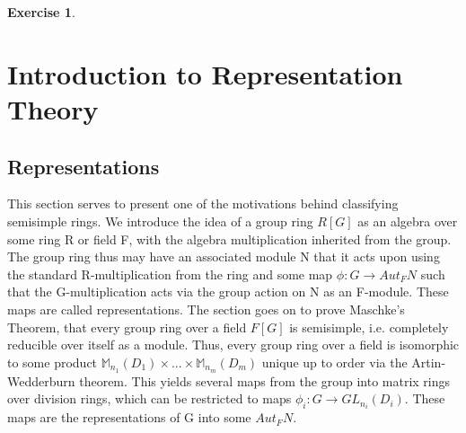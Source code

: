 \documentclass{article}
\newtheorem{exercise}{Exercise}[section]
\begin{document}
\begin{exercise}

  \end{exercise}


\pagebreak

\section{Introduction to Representation Theory}
\subsection{Representations}

This section serves to present one of the motivations behind classifying semisimple rings. We introduce the idea of a group ring $R[G]$ as an algebra over some ring R or field F, with the algebra multiplication inherited from the group. The group ring thus may have an associated module N that it acts upon using the standard R-multiplication from the ring and some map $\phi:G \to Aut_{F}N$ such that the G-multiplication acts via the group action on N as an F-module. These maps are called representations. The section goes on to prove Maschke's Theorem, that every group ring over a field $F[G]$ is semisimple, i.e. completely reducible over itself as a module. Thus, every group ring over a field is isomorphic to some product $\mathbb{M}_{n_{1}}(D_{1}) \times ... \times \mathbb{M}_{n_{m}}(D_{m})$ unique up to order via the Artin-Wedderburn theorem. This yields several maps from the group into matrix rings over division rings, which can be restricted to maps $\phi_{i}: G \to GL_{n_{i}}(D_{i})$. These maps are the representations of G into some $Aut_{F}N$. 
\end{document}
